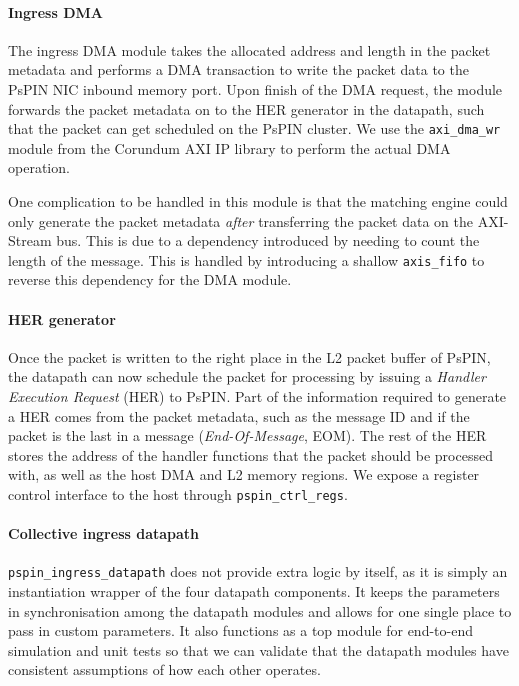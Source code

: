 
\paragraph{Ingress DMA} The ingress DMA module takes the allocated address and length in the packet metadata and performs a DMA transaction to write the packet data to the PsPIN NIC inbound memory port.  Upon finish of the DMA request, the module forwards the packet metadata on to the HER generator in the datapath, such that the packet can get scheduled on the PsPIN cluster.  We use the \texttt{axi\_\-dma\_\-wr} module from the Corundum AXI IP library to perform the actual DMA operation.

One complication to be handled in this module is that the matching engine could only generate the packet metadata \emph{after} transferring the packet data on the AXI-Stream bus.  This is due to a dependency introduced by needing to count the length of the message.  This is handled by introducing a shallow \texttt{axis\_\-fifo} to reverse this dependency for the DMA module.

\paragraph{HER generator} Once the packet is written to the right place in the L2 packet buffer of PsPIN, the datapath can now schedule the packet for processing by issuing a \emph{Handler Execution Request} (HER) to PsPIN.  Part of the information required to generate a HER comes from the packet metadata, such as the message ID and if the packet is the last in a message (\emph{End-Of-Message}, EOM).  The rest of the HER stores the address of the handler functions that the packet should be processed with, as well as the host DMA and L2 memory regions.  We expose a register control interface to the host through \texttt{pspin\_\-ctrl\_\-regs}.

\paragraph{Collective ingress datapath} \texttt{pspin\_\-ingress\_\-datapath} does not provide extra logic by itself, as it is simply an instantiation wrapper of the four datapath components.  It keeps the parameters in synchronisation among the datapath modules and allows for one single place to pass in custom parameters.  It also functions as a top module for end-to-end simulation and unit tests so that we can validate that the datapath modules have consistent assumptions of how each other operates.
 
